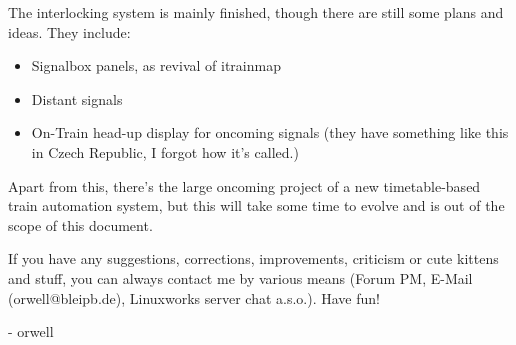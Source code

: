 \documentclass[english]{paper}
\begin{document}
The interlocking system is mainly finished, though there are still
some plans and ideas. They include:
\begin{itemize}
\item Signalbox panels, as revival of itrainmap
\item Distant signals
\item On-Train head-up display for oncoming signals (they have something
like this in Czech Republic, I forgot how it's called.)
\end{itemize}
Apart from this, there's the large oncoming project of a new timetable-based
train automation system, but this will take some time to evolve and
is out of the scope of this document.

If you have any suggestions, corrections, improvements, criticism
or cute kittens and stuff, you can always contact me by various means
(Forum PM, E-Mail (orwell@bleipb.de), Linuxworks server chat a.s.o.).
Have fun!

- orwell
\end{document}
